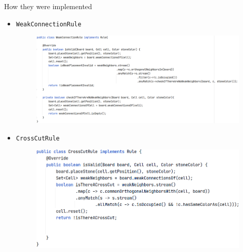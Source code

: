 \documentclass{beamer}
\begin{document}
\begin{frame}[t]{How they were implemented }
	\begin{itemize}
		\item \texttt{WeakConnectionRule}
		\vspace{0.2cm}
		\
		\begin{figure}
			\includegraphics[scale=0.16, center]{images/weakconnectionrule-code.png}
		\end{figure}
		\item \texttt{CrossCutRule}
		\vspace{0.2cm}
		\begin{figure}
			\includegraphics[scale=0.2, center]{images/crosscutrule-code.png}
		\end{figure}
	\end{itemize}
\end{frame}
\end{document}
